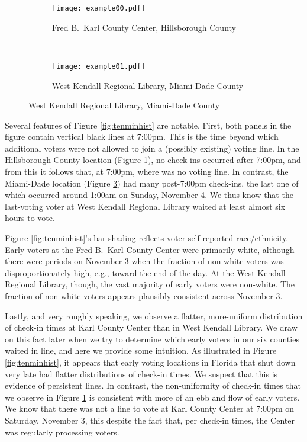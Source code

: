 \documentclass[12pt,titlepage]{article}
\begin{document}
\begin{figure}[!ht]
  \caption{Early voting check-in times on Saturday, November 3, 2012, in two Florida locations}
  \label{fig:tenminhist}
  \centering
  \begin{subfigure}[b]{\linewidth}
    \centering\texttt{[image: example00.pdf]}
    \caption{Fred B.\ Karl County Center, Hillsborough County}
    \label{fig:karlexample}
  \end{subfigure}%
  \\
  \begin{subfigure}[b]{\linewidth}
    \centering\texttt{[image: example01.pdf]}
    \caption{West Kendall Regional Library, Miami-Dade County}
    \label{fig:kendallexample}
  \end{subfigure}
\end{figure}

Several features of Figure \ref{fig:tenminhist} are notable.  First,
both panels in the figure contain vertical black lines at 7:00pm.
This is the time beyond which additional voters were not allowed to
join a (possibly existing) voting line.  In the Hillsborough County
location (Figure \ref{fig:karlexample}), no check-ins occurred after
7:00pm, and from this it follows that, at 7:00pm, where was no voting
line.  In contrast, the Miami-Dade location (Figure
\ref{fig:kendallexample}) had many post-7:00pm check-ins, the last one
of which occurred around 1:00am on Sunday, November 4.  We thus know
that the last-voting voter at West Kendall Regional Library waited at
least almost six hours to vote.

Figure \ref{fig:tenminhist}'s bar shading reflects voter self-reported
race/ethnicity.  Early voters at the Fred B.\ Karl County Center were
primarily white, although there were periods on November 3 when the
fraction of non-white voters was disproportionately high, e.g., toward
the end of the day.  At the West Kendall Regional Library, though, the
vast majority of early voters were non-white.  The fraction of
non-white voters appears plausibly consistent across November 3.

Lastly, and very roughly speaking, we observe a flatter, more-uniform
distribution of check-in times at Karl County Center than in West
Kendall Library.  We draw on this fact later when we try to determine
which early voters in our six counties waited in line, and here we
provide some intuition.  As illustrated in Figure
\ref{fig:tenminhist}, it appears that early voting locations in
Florida that shut down very late had flatter distributions of check-in
times.  We suspect that this is evidence of persistent lines.  In
contrast, the non-uniformity of check-in times that we observe in
Figure \ref{fig:karlexample} is consistent with more of an ebb and
flow of early voters.  We know that there was not a line to vote at
Karl County Center at 7:00pm on Saturday, November 3, this despite the
fact that, per check-in times, the Center was regularly processing
voters.
\end{document}
